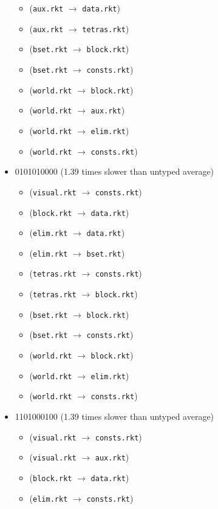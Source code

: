 \documentclass{article}
\newcommand{\mono}[1]{\texttt{#1}}
\begin{document}
\begin{itemize}
\begin{itemize}
  \item (\mono{aux.rkt} $\rightarrow$ \mono{data.rkt})
  \item (\mono{aux.rkt} $\rightarrow$ \mono{tetras.rkt})
  \item (\mono{bset.rkt} $\rightarrow$ \mono{block.rkt})
  \item (\mono{bset.rkt} $\rightarrow$ \mono{consts.rkt})
  \item (\mono{world.rkt} $\rightarrow$ \mono{block.rkt})
  \item (\mono{world.rkt} $\rightarrow$ \mono{aux.rkt})
  \item (\mono{world.rkt} $\rightarrow$ \mono{elim.rkt})
  \item (\mono{world.rkt} $\rightarrow$ \mono{consts.rkt})
  \end{itemize}
\item 0101010000 (1.39 times slower than untyped average)
  \begin{itemize}
  \item (\mono{visual.rkt} $\rightarrow$ \mono{consts.rkt})
  \item (\mono{block.rkt} $\rightarrow$ \mono{data.rkt})
  \item (\mono{elim.rkt} $\rightarrow$ \mono{data.rkt})
  \item (\mono{elim.rkt} $\rightarrow$ \mono{bset.rkt})
  \item (\mono{tetras.rkt} $\rightarrow$ \mono{consts.rkt})
  \item (\mono{tetras.rkt} $\rightarrow$ \mono{block.rkt})
  \item (\mono{bset.rkt} $\rightarrow$ \mono{block.rkt})
  \item (\mono{bset.rkt} $\rightarrow$ \mono{consts.rkt})
  \item (\mono{world.rkt} $\rightarrow$ \mono{block.rkt})
  \item (\mono{world.rkt} $\rightarrow$ \mono{elim.rkt})
  \item (\mono{world.rkt} $\rightarrow$ \mono{consts.rkt})
  \end{itemize}
\item 1101000100 (1.39 times slower than untyped average)
  \begin{itemize}
  \item (\mono{visual.rkt} $\rightarrow$ \mono{consts.rkt})
  \item (\mono{visual.rkt} $\rightarrow$ \mono{aux.rkt})
  \item (\mono{block.rkt} $\rightarrow$ \mono{data.rkt})
  \item (\mono{elim.rkt} $\rightarrow$ \mono{consts.rkt})

\end{itemize}
\end{itemize}
\end{document}
